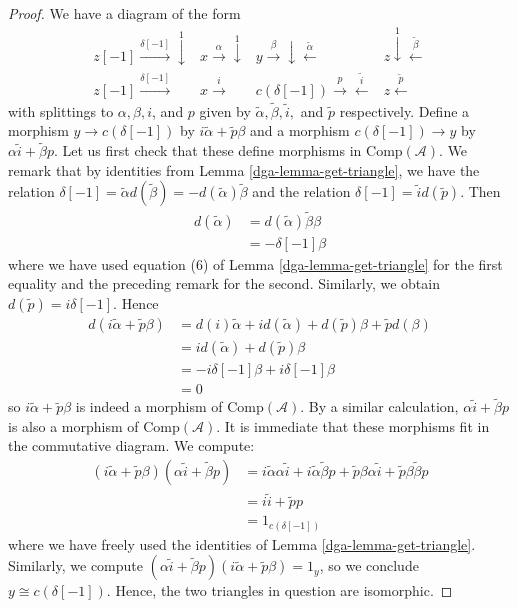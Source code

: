 \begin{proof}

We have a diagram of the form
$$
\begin{array}{cccc}z[-1]\overset{\delta[-1]}{\longrightarrow}\overset{1}{\downarrow} & x\overset{\alpha}{\longrightarrow}\overset{1}{\downarrow} & y\overset{\beta}{\longrightarrow}\downarrow\overset{\tilde{\alpha}}{\longleftarrow} & z\overset{1}{\downarrow}\overset{\tilde\beta}{\longleftarrow} \\ z[-1] \overset{\delta[-1]}{\longrightarrow} & x\overset{i}{\longrightarrow} & c(\delta[-1]) \overset{p}{\longrightarrow}\overset{\tilde i}{\longleftarrow} & z\overset{\tilde p}{\longleftarrow}\end{array}
$$
with splittings to $\alpha, \beta, i$, and $p$ given by
$\tilde{\alpha}, \tilde{\beta}, \tilde{i},$ and $\tilde{p}$ respectively.
Define a morphism $y \to c(\delta[-1])$ by
$i\tilde{\alpha} + \tilde{p}\beta$ and a morphism
$c(\delta[-1]) \to y$ by $\alpha \tilde{i} + \tilde{\beta} p$.
Let us first check that these define morphisms in $\text{Comp}(\mathcal{A})$.
We remark that by identities from Lemma \ref{dga-lemma-get-triangle},
we have the relation
$\delta[-1] = \tilde{\alpha}d(\tilde{\beta}) = -d(\tilde{\alpha})\tilde{\beta}$
and the relation $\delta[-1] = \tilde{i}d(\tilde{p})$. Then
\begin{align*}
d(\tilde{\alpha})
& =
d(\tilde{\alpha})\tilde{\beta}\beta \\
& =
-\delta[-1]\beta
\end{align*}
where we have used equation (6) of
Lemma \ref{dga-lemma-get-triangle} for the first equality and
the preceding remark for the second. Similarly, we obtain
$d(\tilde{p}) = i\delta[-1]$. Hence
\begin{align*}
d(i\tilde{\alpha} + \tilde{p}\beta)
& =
d(i)\tilde{\alpha} + id(\tilde{\alpha}) +
d(\tilde{p})\beta + \tilde{p}d(\beta) \\
& =
id(\tilde{\alpha}) + d(\tilde{p})\beta \\
& =
-i\delta[-1]\beta + i\delta[-1]\beta \\
& =
0
\end{align*}
so $i\tilde{\alpha} + \tilde{p}\beta$ is indeed a morphism of
$\text{Comp}(\mathcal{A})$. By a similar calculation,
$\alpha \tilde{i} + \tilde{\beta} p$ is also a morphism of
$\text{Comp}(\mathcal{A})$. It is immediate that these morphisms
fit in the commutative diagram. We compute:
\begin{align*}
(i\tilde{\alpha} + \tilde{p}\beta)(\alpha \tilde{i} + \tilde{\beta} p)
& =
i\tilde{\alpha}\alpha\tilde{i} + i\tilde{\alpha}\tilde{\beta}p
+ \tilde{p}\beta\alpha\tilde{i} + \tilde{p}\beta\tilde{\beta}p \\
& =
i\tilde{i} + \tilde{p}p \\
& =
1_{c(\delta[-1])}
\end{align*}
where we have freely used the identities of
Lemma \ref{dga-lemma-get-triangle}. Similarly, we compute
$(\alpha \tilde{i} + \tilde{\beta} p)(i\tilde{\alpha} + \tilde{p}\beta) = 1_y$,
so we conclude $y \cong c(\delta[-1])$. Hence, the two triangles in question
are isomorphic.
\end{proof}


